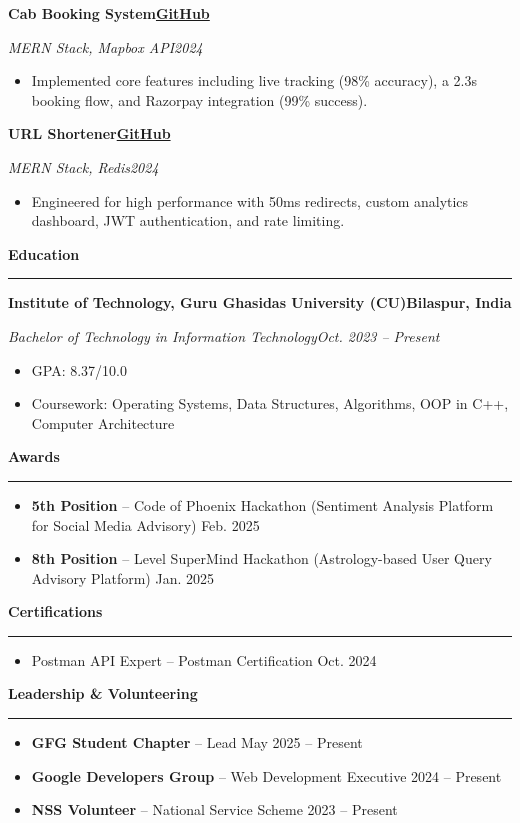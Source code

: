 \documentclass{article}
\newcommand{\sectionheader}[1]{%
  \vspace{1.5ex}\noindent\textbf{\Large #1}%
  \par\rule{\textwidth}{0.8pt}\vspace{0.5ex}%
}
\newcommand{\subheading}[4]{%
  \vspace{0.5ex}\noindent\textbf{#1}\hfill\textbf{#2}\par%
  \noindent\textit{#3}\hfill\textit{#4}\par\vspace{-0.5ex}%
}
\begin{document}
\subheading{Cab Booking System}{\href{https://github.com/Harsh0369/Cab-Booking-System}{GitHub}}
            {MERN Stack, Mapbox API}{2024}
\begin{itemize}[leftmargin=*,noitemsep,topsep=0pt,parsep=0pt,partopsep=0pt]
    \item Implemented core features including live tracking (98\% accuracy), a 2.3s booking flow, and Razorpay integration (99\% success).
\end{itemize}

\subheading{URL Shortener}{\href{https://github.com/Harsh0369/URL-Shortener}{GitHub}}
            {MERN Stack, Redis}{2024}
\begin{itemize}[leftmargin=*,noitemsep,topsep=0pt,parsep=0pt,partopsep=0pt]
    \item Engineered for high performance with 50ms redirects, custom analytics dashboard, JWT authentication, and rate limiting.
\end{itemize}

\sectionheader{Education}
\subheading{Institute of Technology, Guru Ghasidas University (CU)}{Bilaspur, India}
            {Bachelor of Technology in Information Technology}{Oct. 2023 – Present}
\begin{itemize}[leftmargin=*,noitemsep,topsep=0pt,parsep=0pt,partopsep=0pt]
    \item GPA: 8.37/10.0
    \item Coursework: Operating Systems, Data Structures, Algorithms, OOP in C++, Computer Architecture
\end{itemize}

\sectionheader{Awards}
\begin{itemize}[leftmargin=*,noitemsep,topsep=0pt,parsep=0pt,partopsep=0pt]
    \item \textbf{5th Position} – Code of Phoenix Hackathon (Sentiment Analysis Platform for Social Media Advisory) \hfill Feb. 2025
    \item \textbf{8th Position} – Level SuperMind Hackathon (Astrology-based User Query Advisory Platform) \hfill Jan. 2025
\end{itemize}

\sectionheader{Certifications}
\begin{itemize}[leftmargin=*,noitemsep,topsep=0pt,parsep=0pt,partopsep=0pt]
    \item Postman API Expert – Postman Certification \hfill Oct. 2024
\end{itemize}

\sectionheader{Leadership \& Volunteering}
\begin{itemize}[leftmargin=*,noitemsep,topsep=0pt,parsep=0pt,partopsep=0pt]
    \item \textbf{GFG Student Chapter} – Lead \hfill May 2025 – Present
    \item \textbf{Google Developers Group} – Web Development Executive \hfill 2024 – Present
    \item \textbf{NSS Volunteer} – National Service Scheme \hfill 2023 – Present
\end{itemize}
\end{document}
